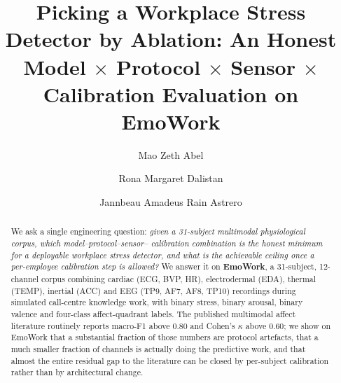 \documentclass[sigconf,nonacm]{acmart}
\begin{document}
\title{Picking a Workplace Stress Detector by Ablation: An Honest
Model \(\times\) Protocol \(\times\) Sensor \(\times\) Calibration
Evaluation on EmoWork}

\author{Mao Zeth Abel}
\email{}

\author{Rona Margaret Dalistan}
\email{}

\author{Jannbeau Amadeus Rain Astrero}
\email{}

\renewcommand{\shortauthors}{Abel, Dalistan, and Astrero}

\begin{abstract}
We ask a single engineering question: \emph{given a 31-subject
multimodal physiological corpus, which model--protocol--sensor--%
calibration combination is the honest minimum for a deployable
workplace stress detector, and what is the achievable ceiling once a
per-employee calibration step is allowed?} We answer it on
\textbf{EmoWork}, a 31-subject, 12-channel corpus combining cardiac
(ECG, BVP, HR), electrodermal (EDA), thermal (TEMP), inertial (ACC)
and EEG (TP9, AF7, AF8, TP10) recordings during simulated call-centre
knowledge work, with binary stress, binary arousal, binary valence
and four-class affect-quadrant labels. The published multimodal
affect literature routinely reports macro-F1 above 0.80 and
Cohen's \(\kappa\) above 0.60; we show on EmoWork that a substantial
fraction of those numbers are protocol artefacts, that a much smaller
fraction of channels is actually doing the predictive work, and that
almost the entire residual gap to the literature can be closed by
per-subject calibration rather than by architectural change.


\end{abstract}
\end{document}
